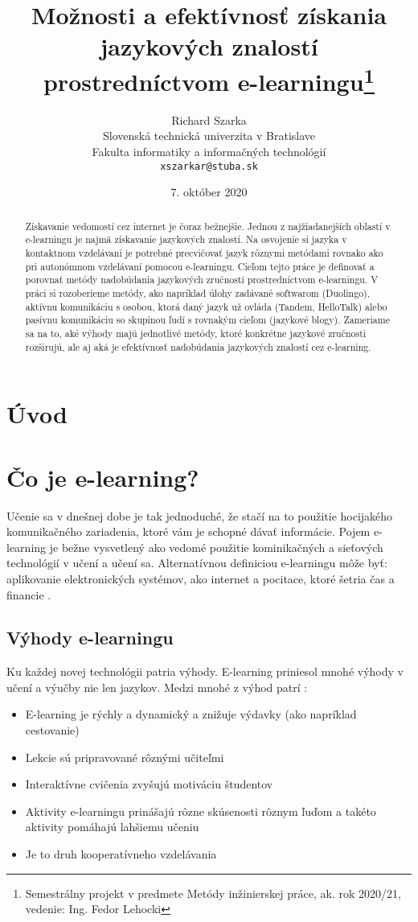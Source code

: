 \documentclass[10pt,twoside,slovak,a4paper]{article}
\title{Možnosti a efektívnosť získania jazykových znalostí prostredníctvom
e-learningu\thanks{Semestrálny projekt v predmete Metódy inžinierskej práce, ak. rok 2020/21, vedenie: Ing. Fedor Lehocki }} %
\author{Richard Szarka\\[2pt]
	{\small Slovenská technická univerzita v Bratislave}\\
	{\small Fakulta informatiky a informačných technológií}\\
	{\small \texttt{xszarkar@stuba.sk}}
	}
\date{\small 7. október 2020} %
\begin{document}
\maketitle

\begin{abstract}
Získavanie vedomostí cez internet je čoraz bežnejšie. Jednou z najžiadanejších oblastí v e-learningu je najmä získavanie jazykových znalostí. Na osvojenie si jazyka v kontaktnom vzdelávaní je potrebné precvičovať jazyk rôznymi metódami rovnako ako pri autonómnom vzdelávaní pomocou e-learningu. Cieľom tejto práce je definovať a porovnať metódy nadobúdania jazykových zručností prostredníctvom e-learningu. V práci si rozoberieme metódy, ako napríklad úlohy zadávané softwarom (Duolingo), aktívnu komunikáciu s osobou, ktorá daný jazyk už ovláda (Tandem, HelloTalk) alebo pasívnu komunikáciu so skupinou ľudí s rovnakým cieľom (jazykové blogy). Zameriame sa na to, aké výhody majú jednotlivé metódy, ktoré konkrétne jazykové zručnosti rozširujú, ale aj aká je efektívnosť nadobúdania jazykových znalostí cez e-learning.
\end{abstract}

\section{Úvod}

\section{Čo je e-learning?}
Učenie sa v dnešnej dobe je tak jednoduché, že stačí na to použitie hocijakého komunikačného zariadenia, ktoré vám je schopné dávať informácie\cite{vyhody}. Pojem e-learning je bežne vysvetlený ako vedomé použitie kominikačných a sieťových technológií v učení a učení sa. Alternatívnou definiciou e-learningu môže byť: aplikovanie elektronických systémov, ako internet a pocitace, ktoré šetria čas a financie \cite{efektivnost}. 

\subsection{Výhody e-learningu}
Ku každej novej technológii patria výhody. E-learning priniesol mnohé výhody v učení a výučby nie len jazykov. Medzi mnohé z výhod patrí :\\
\begin{itemize}
\item E-learning je rýchly a dynamický a znižuje výdavky (ako napríklad cestovanie) \cite{efektivnost}
\item Lekcie sú pripravované rôznými učiteľmi \cite{efektivnost}
\item Interaktívne cvičenia zvyšujú motiváciu študentov \cite{vyhody}
\item Aktivity e-learningu prinášajú rôzne skúsenosti rôznym ľuďom a takéto aktivity pomáhajú lahšiemu učeniu \cite{vyhody}
\item Je to druh kooperatívneho vzdelávania \cite{efektivnost}
\end{itemize}
\end{document}
